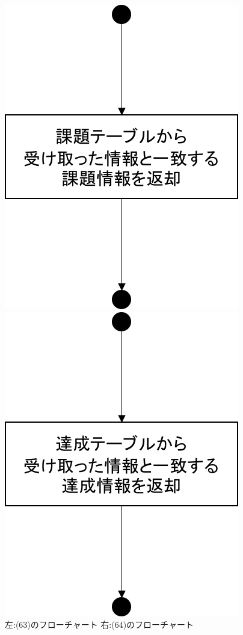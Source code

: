 \begin{figure}[htbp]
 \begin{minipage}{0.5\hsize}
  \begin{center}
   \includegraphics[width=0.6\linewidth,clip]{./img/flow/63.png}
  \end{center}
 \end{minipage}
 \begin{minipage}{0.5\hsize}
  \begin{center}
   \includegraphics[width=0.6\linewidth,clip]{./img/flow/64.png}
  \end{center}
 \end{minipage}
 \caption{左:(63)のフローチャート 右:(64)のフローチャート}\label{fig:62to63to64}
\end{figure}

